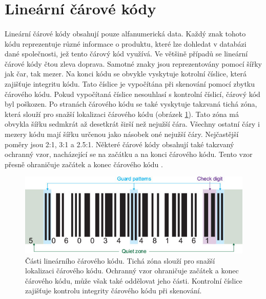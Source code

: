\section{Lineární čárové kódy}

\paragraph{}Lineární čárové kódy obsahují pouze alfanumerická data. Každý znak tohoto kódu reprezentuje různé informace o produktu, které lze dohledat v databázi dané společnosti, jež tento čárový kód využívá. Ve většině případů se lineární čárové kódy čtou zleva doprava. Samotné znaky jsou reprezentovány pomocí šířky jak čar, tak mezer. Na konci kódu se obvykle vyskytuje kotrolní číslice, která zajišťuje integritu kódu. Tato číslice je vypočítána při skenování pomocí zbytku čárového kódu. Pokud vypočítaná číslice nesouhlasí s kontrolní číslicí, čárový kód byl poškozen. Po stranách čárového kódu se také vyskytuje takzvaná tichá zóna, která slouží pro snažší lokalizaci čárového kódu (obrázek \ref{barcode1}). Tato zóna má obvykla šířku sedmkrát až desetkrát širší než nejužší čára. Všechny ostatní čáry i mezery kódu mají šířku určenou jako násobek oné nejužší čáry. Nejčastější poměry jsou 2:1, 3:1 a 2.5:1. Některé čárové kódy obsahují také takzvaný ochranný vzor, nacházející se na začátku a na konci čárového kódu. Tento vzor přesně ohraničuje začátek a konec čárového kódu \cite{cognex}.
\pagebreak
\begin{figure}[h]\centering
    \centering
    \includegraphics[width=0.8\linewidth]{obrazky-figures/basic_barcode.png}
    \caption{Části lineárního čárového kódu. Tichá zóna slouží pro snažší lokalizaci čárového kódu. Ochranný vzor ohraničuje začátek a konec čárového kódu, může však také oddělovat jeho části. Kontrolní číslice zajišťuje kontrolu integrity čárového kódu při skenování\protect\footnotemark{}.}
    \label{barcode1}
\end{figure}

